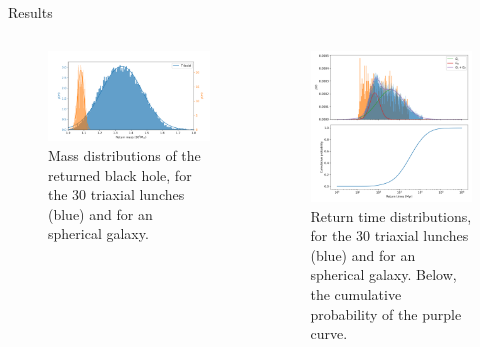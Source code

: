 \documentclass{beamer}
\begin{document}
\begin{frame}{Results}
	\begin{columns}
		\begin{column}{0.4\textwidth}
			\begin{figure}[h]
				\centering
				\includegraphics[width=\linewidth]{"../Files/Week 14/dist_masses"}
				\caption{Mass distributions of the returned black hole, for the 30 triaxial lunches (blue) and for an spherical galaxy.}
				\label{fig: massDist}
			\end{figure}
		\end{column}
		\begin{column}{0.6\textwidth}
			\begin{figure}[h]
				\centering
				\includegraphics[width = 0.8\linewidth]{"../Files/Week 14/dist_times"}
				\caption{Return time distributions, for the 30 triaxial lunches (blue) and for an spherical galaxy. Below, the cumulative probability of the purple curve.}
				\label{fig: timeDist}
			\end{figure}
		\end{column}
	\end{columns}
\end{frame}
\end{document}
